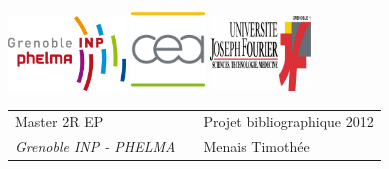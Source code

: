 \documentclass[a4paper,11pt]{article}
\begin{document}
\setlength{\parindent}{0pt}

\thispagestyle{empty}

\includegraphics[height=2cm]{phelma.jpg} \hfill \includegraphics[height=2.2cm]{cea.jpg} \hfill \includegraphics[height=2cm]{ujf.jpg}

\vspace{0.5cm}

\begin{tabularx}{\textwidth}{@{} l X l @{} }
{\sc Master  2R EP} & & Projet bibliographique 2012 \\
{\it Grenoble INP - PHELMA} & & Menais Timothée \\

\end{tabularx}
\end{document}
